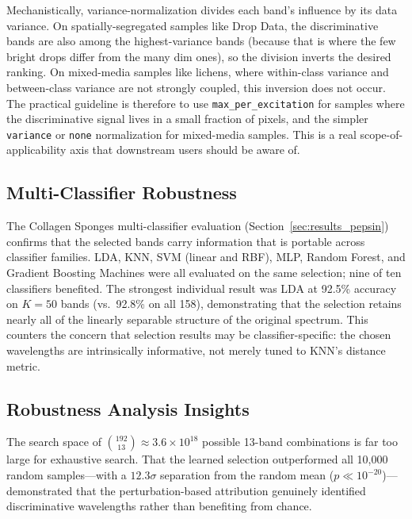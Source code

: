 Mechanistically, variance-normalization divides each band's influence by its data variance.
On spatially-segregated samples like Drop Data, the discriminative bands are also among the highest-variance bands (because that is where the few bright drops differ from the many dim ones), so the division inverts the desired ranking.
On mixed-media samples like lichens, where within-class variance and between-class variance are not strongly coupled, this inversion does not occur.
The practical guideline is therefore to use \texttt{max\_per\_excitation} for samples where the discriminative signal lives in a small fraction of pixels, and the simpler \texttt{variance} or \texttt{none} normalization for mixed-media samples.
This is a real scope-of-applicability axis that downstream users should be aware of.

\subsection{Multi-Classifier Robustness}
\label{sec:discussion_multi_classifier}

The Collagen Sponges multi-classifier evaluation (Section~\ref{sec:results_pepsin}) confirms that the selected bands carry information that is portable across classifier families.
LDA, KNN, SVM (linear and RBF), MLP, Random Forest, and Gradient Boosting Machines were all evaluated on the same selection; nine of ten classifiers benefited.
The strongest individual result was LDA at 92.5\% accuracy on $K=50$ bands (vs.\ 92.8\% on all 158), demonstrating that the selection retains nearly all of the linearly separable structure of the original spectrum.
This counters the concern that selection results may be classifier-specific: the chosen wavelengths are intrinsically informative, not merely tuned to KNN's distance metric.

\subsection{Robustness Analysis Insights}
\label{sec:discussion_robustness}
The search space of $\binom{192}{13} \approx 3.6 \times 10^{18}$ possible 13-band combinations is far too large for exhaustive search.
That the learned selection outperformed all 10,000 random samples---with a $12.3\sigma$ separation from the random mean ($p \ll 10^{-20}$)---demonstrated that the perturbation-based attribution genuinely identified discriminative wavelengths rather than benefiting from chance.

